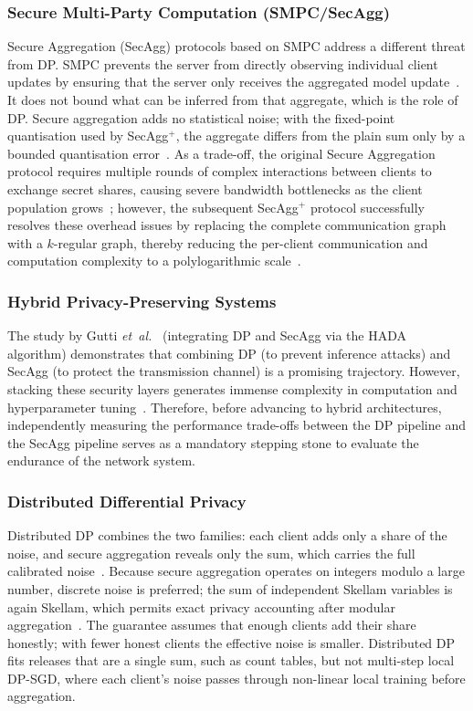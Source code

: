 \subsubsection*{Secure Multi-Party Computation (SMPC/SecAgg)}
Secure Aggregation (SecAgg) protocols based on SMPC address a different threat from DP. SMPC prevents the server from directly observing individual client updates by ensuring that the server only receives the aggregated model update~\cite{bessaa2026}. It does not bound what can be inferred from that aggregate, which is the role of DP. Secure aggregation adds no statistical noise; with the fixed-point quantisation used by SecAgg$^+$, the aggregate differs from the plain sum only by a bounded quantisation error~\cite{bell2020}. As a trade-off, the original Secure Aggregation protocol requires multiple rounds of complex interactions between clients to exchange secret shares, causing severe bandwidth bottlenecks as the client population grows~\cite{bonawitz2017}; however, the subsequent SecAgg$^+$ protocol successfully resolves these overhead issues by replacing the complete communication graph with a $k$-regular graph, thereby reducing the per-client communication and computation complexity to a polylogarithmic scale~\cite{bell2020}.

\subsubsection*{Hybrid Privacy-Preserving Systems}
The study by Gutti \textit{et~al.}~\cite{gutti2024} (integrating DP and SecAgg via the HADA algorithm) demonstrates that combining DP (to prevent inference attacks) and SecAgg (to protect the transmission channel) is a promising trajectory. However, stacking these security layers generates immense complexity in computation and hyperparameter tuning~\cite{gutti2024}. Therefore, before advancing to hybrid architectures, independently measuring the performance trade-offs between the DP pipeline and the SecAgg pipeline serves as a mandatory stepping stone to evaluate the endurance of the network system.

\subsubsection*{Distributed Differential Privacy}
Distributed DP combines the two families: each client adds only a share of the noise, and secure aggregation reveals only the sum, which carries the full calibrated noise~\cite{kairouz2021, agarwal2021}. Because secure aggregation operates on integers modulo a large number, discrete noise is preferred; the sum of independent Skellam variables is again Skellam, which permits exact privacy accounting after modular aggregation~\cite{agarwal2021}. The guarantee assumes that enough clients add their share honestly; with fewer honest clients the effective noise is smaller. Distributed DP fits releases that are a single sum, such as count tables, but not multi-step local DP-SGD, where each client's noise passes through non-linear local training before aggregation.

